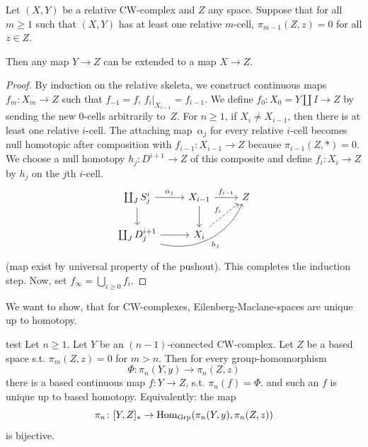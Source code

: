 \documentclass[language=english]{TemplateLecture}
\begin{document}
\begin{lemma}
    Let \((X,Y)\) be a relative CW-complex and \(Z\) any space.
    Suppose that for all \(m \ge 1\) such that \((X,Y)\) has at least one relative \(m\)-cell, \(\pi_{m-1}(Z,z) = 0\) for all \(z \in Z\).

    Then any map \(Y \to Z\) can be extended to a map \(X\to Z\).
\end{lemma}

\begin{proof}
    By induction on the relative skeleta, we construct continuous maps \(f_m \colon X_m \to Z\) such that \(f_{-1} = f\), \(f_i|_{X_{i-1}} = f_{i-1}\).
    We define \(f_0 \colon X_0 = Y \amalg I \to Z\) by sending the new \(0\)-cells arbitrarily to~\(Z\).
    For \(n \ge 1\), if \(X_i \ne X_{i-1}\), then there is at least one relative \(i\)-cell.
    The attaching map~\(\alpha_j\) for every relative \(i\)-cell becomes null homotopic after composition with \(f_{i-1} \colon X_{i-1} \to Z\)  because \(\pi_{i-1}(Z,*) = 0\).
    We choose a null homotopy \(h_j \colon D^{i+1} \to Z\) of this composite and define \(f_i \colon X_i \to Z\) by \(h_j\) on the \(j\)th \(i\)-cell.
    \begin{equation*}
        \begin{tikzcd}
            \coprod_J S_j^i \ar[r, "\alpha_j"] \ar[d]
            & X_{i-1} \ar[r, "f_{i-1}"] \ar[d]
            & Z \\
            \coprod_J D_j^{i+1} \ar[r] \ar[urr, bend right=40, "h_j"']
            & X_i \ar[ur, dashed, "f_i"]
        \end{tikzcd}
    \end{equation*}
    (map exist by universal property of the pushout).
    This completes the induction step.
    Now, set \(f_{\infty} = \bigcup_{i \ge 0} f_i\).
\end{proof}



We want to show, that for CW-complexes, Eilenberg-Maclane-spaces are unique up to homotopy.

\begin{thm}{}{test}
    Let \(n \geq 1\). Let \(Y\) be an \((n-1)\)-connected CW-complex. Let \(Z\) be a based space s.t. \(\pi_m(Z,z) = 0\) for \(m > n\). Then for every group-homomorphism
    \[\Phi\colon \pi_n(Y,y) \to \pi_n(Z,z)\]
    there is a based continuous map \(f\colon Y \to Z\), s.t. \(\pi_n(f) = \Phi\). and such an \(f\) is unique up to based homotopy. Equivalently: the map
    \[\pi_n\colon[Y, Z]_* \to \operatorname{Hom}_{\mathrm{Grp}}(\pi_n(Y,y) ,\pi_n(Z,z))\]
    is bijective.
\end{thm}
\end{document}
